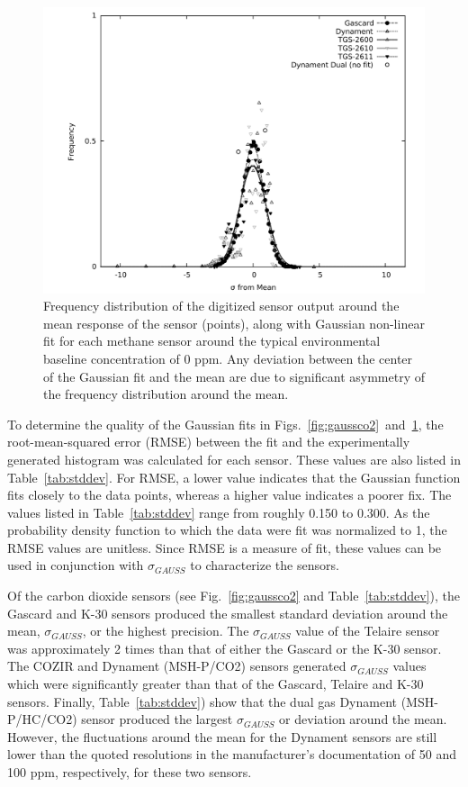 \documentclass[preprint,sort&compress]{elsarticle}
\begin{document}
			\begin{figure}[!t]
				\centering
				\includegraphics[width=\columnwidth]{honey8.pdf}
				\caption{Frequency distribution of the digitized sensor output around the mean response of the sensor (points), along with Gaussian non-linear fit for each methane sensor around the typical environmental baseline concentration of 0 ppm.  Any deviation between the center of the Gaussian fit and the mean are due to significant asymmetry of the frequency distribution around the mean.}
				\label{fig:gaussch4}
			\end{figure}
	
			To determine the quality of the Gaussian fits in Figs.~\ref{fig:gaussco2}~and~\ref{fig:gaussch4}, the root-mean-squared error (RMSE) between the fit and the experimentally generated histogram was calculated for each sensor.  These values are also listed in Table~\ref{tab:stddev}.  For RMSE, a lower value indicates that the Gaussian function fits closely to the data points, whereas a higher value indicates a poorer fix.   The values listed in Table~\ref{tab:stddev} range from roughly 0.150 to 0.300.  As the probability density function to which the data were fit was normalized to 1, the RMSE values are unitless.  Since RMSE is a measure of fit, these values can be used in conjunction with $\sigma_{GAUSS}$ to characterize the sensors.
			
			Of the carbon dioxide sensors (see Fig.~\ref{fig:gaussco2} and Table~\ref{tab:stddev}), the Gascard and K-30 sensors produced the smallest standard deviation around the mean, $\sigma_{GAUSS}$, or the highest precision.  The $\sigma_{GAUSS}$ value of the Telaire sensor was approximately 2 times than that of either the Gascard or the K-30 sensor.  The COZIR and Dynament (MSH-P/CO2) sensors generated $\sigma_{GAUSS}$ values which were significantly greater than that of the Gascard, Telaire and K-30 sensors.  Finally, Table~\ref{tab:stddev}) show that the dual gas Dynament (MSH-P/HC/CO2) sensor produced the largest $\sigma_{GAUSS}$ or deviation around the mean. However, the fluctuations around the mean for the Dynament sensors are still lower than the quoted resolutions in the manufacturer's documentation of 50 and 100 ppm, respectively, for these two sensors.
			
\end{document}
